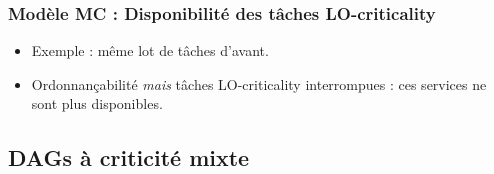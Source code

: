\documentclass[xcolor=table]{beamer}
\begin{document}

\begin{frame}
	\frametitle{Modèle MC : Disponibilité des tâches LO-criticality}
	\begin{itemize}
		\item Exemple : même lot de tâches d'avant.
	\end{itemize}
	\begin{figure}
		
	\end{figure}
	
	\begin{itemize}
		\item<2-> Ordonnançabilité \textit{mais} tâches LO-criticality interrompues :
		ces services ne sont plus disponibles.
	\end{itemize}
\end{frame}

\subsection{DAGs à criticité mixte}
\end{document}
